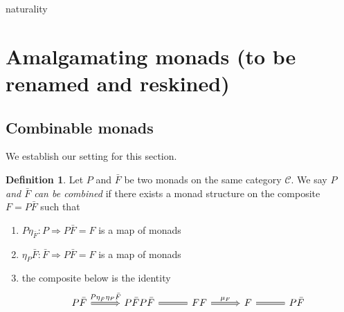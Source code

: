 \documentclass[a4paper,10pt
,draft
]{article}%
\numberwithin{equation}{section}
\numberwithin{figure}{section}
\theoremstyle{definition} %
\newtheorem{definition}[equation]{Definition}%
\newcommand{\1}{\ensuremath{\mathbbm 1}}%
\begin{document}
{\color{red} naturality}





\newpage


\section{Amalgamating monads (to be renamed and reskined)}
\label{AMALGMON_SEC}

\subsection{Combinable monads}
\label{COMBMON_SEC}

We establish our setting for this section.

\begin{definition}\label{AMALGMON DEF}
Let $P$ and $\bar{F}$ be two monads on the same category $\mathcal{C}$.
We say \emph{$P$ and $\bar{F}$ can be combined} if there exists 
a monad structure on the composite 
$F = P \bar{F}$ such that
\begin{enumerate}[label=(\roman*)]
\item $P \eta_{\bar{F}} \colon P \Rightarrow P \bar{F} = F$
is a map of monads
\item $\eta_P \bar{F} \colon \bar{F} \Rightarrow P \bar{F} = F$
is a map of monads
\item the composite below is the identity
\[
\begin{tikzcd}[column sep=3em]
	P \bar{F} \ar[Rightarrow]{r}{P \eta_{\bar{F}} \eta_P \bar{F}}
&
	P \bar{F} P \bar{F} \ar[equal]{r}
&
	FF  \ar[Rightarrow]{r}{\mu_F}
&
	F \ar[equal]{r}
&
	P \bar{F}
\end{tikzcd}
\]
\end{enumerate}
\end{definition}
\end{document}
